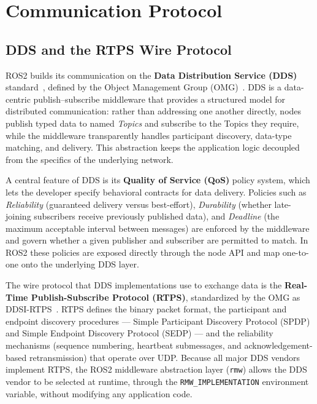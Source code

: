 \section{Communication Protocol}

\subsection{DDS and the RTPS Wire Protocol}

ROS2 builds its communication on the \textbf{Data Distribution Service (DDS)} standard~\cite{omg_dds14}, defined by the Object Management Group (OMG)~\cite{pardo2003dds}. DDS is a data-centric publish--subscribe middleware that provides a structured model for distributed communication: rather than addressing one another directly, nodes publish typed data to named \textit{Topics} and subscribe to the Topics they require, while the middleware transparently handles participant discovery, data-type matching, and delivery. This abstraction keeps the application logic decoupled from the specifics of the underlying network.

A central feature of DDS is its \textbf{Quality of Service (QoS)} policy system, which lets the developer specify behavioral contracts for data delivery. Policies such as \textit{Reliability} (guaranteed delivery versus best-effort), \textit{Durability} (whether late-joining subscribers receive previously published data), and \textit{Deadline} (the maximum acceptable interval between messages) are enforced by the middleware and govern whether a given publisher and subscriber are permitted to match. In ROS2 these policies are exposed directly through the node API and map one-to-one onto the underlying DDS layer.

The wire protocol that DDS implementations use to exchange data is the \textbf{Real-Time Publish-Subscribe Protocol (RTPS)}, standardized by the OMG as DDSI-RTPS~\cite{omg_rtps25}. RTPS defines the binary packet format, the participant and endpoint discovery procedures --- Simple Participant Discovery Protocol (SPDP) and Simple Endpoint Discovery Protocol (SEDP) --- and the reliability mechanisms (sequence numbering, heartbeat submessages, and acknowledgement-based retransmission) that operate over UDP. Because all major DDS vendors implement RTPS, the ROS2 middleware abstraction layer (\texttt{rmw}) allows the DDS vendor to be selected at runtime, through the \texttt{RMW\_IMPLEMENTATION} environment variable, without modifying any application code.

